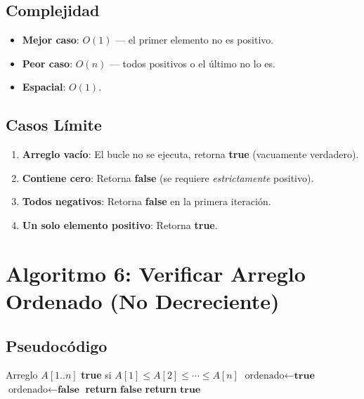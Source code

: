 \documentclass[11pt,a4paper]{article}
\begin{document}
\subsection{Complejidad}
\begin{itemize}
    \item \textbf{Mejor caso}: $O(1)$ --- el primer elemento no es positivo.
    \item \textbf{Peor caso}: $O(n)$ --- todos positivos o el último no lo es.
    \item \textbf{Espacial}: $O(1)$.
\end{itemize}

\subsection{Casos Límite}
\begin{enumerate}
    \item \textbf{Arreglo vacío}: El bucle no se ejecuta, retorna \textbf{true} (vacuamente verdadero).
    \item \textbf{Contiene cero}: Retorna \textbf{false} (se requiere \emph{estrictamente} positivo).
    \item \textbf{Todos negativos}: Retorna \textbf{false} en la primera iteración.
    \item \textbf{Un solo elemento positivo}: Retorna \textbf{true}.
\end{enumerate}

\newpage

\section{Algoritmo 6: Verificar Arreglo Ordenado (No Decreciente)}

\subsection{Pseudocódigo}
\begin{algorithm}[H]
\caption{Verificar Orden No Decreciente}
\begin{algorithmic}[1]
\Require Arreglo $A[1..n]$
\Ensure \textbf{true} si $A[1] \leq A[2] \leq \cdots \leq A[n]$
\State $\text{ordenado} \gets \textbf{true}$
        \State $\text{ordenado} \gets \textbf{false}$
        \State \textbf{return} $\textbf{false}$
    \EndIf
\EndFor
\State \textbf{return} $\textbf{true}$
\end{algorithmic}
\end{algorithm}
\end{document}
